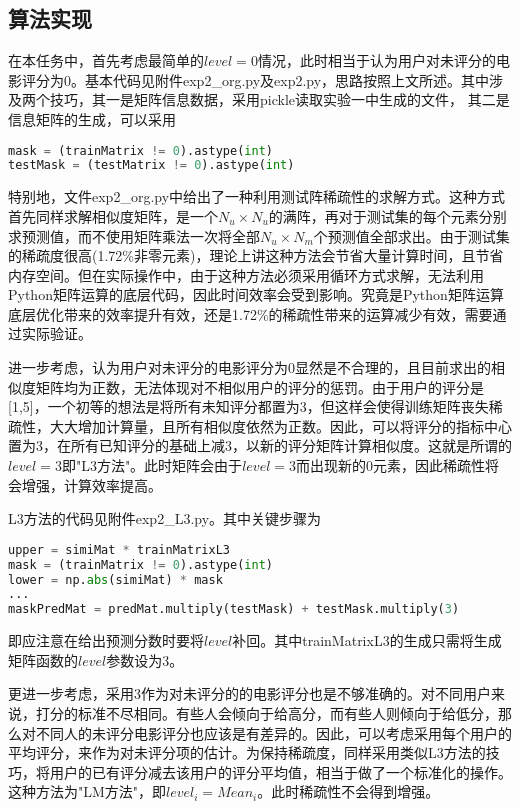\documentclass[a4paper,12pt]{article}
\begin{document}
    \subsection{算法实现}
    在本任务中，首先考虑最简单的$level=0$情况，此时相当于认为用户对未评分的电影评分为0。基本代码见附件exp2\_org.py及exp2.py，思路按照上文所述。其中涉及两个技巧，其一是矩阵信息数据，采用pickle读取实验一中生成的文件，
    其二是信息矩阵的生成，可以采用
    \begin{lstlisting}[language=python]
mask = (trainMatrix != 0).astype(int)
testMask = (testMatrix != 0).astype(int)
    \end{lstlisting}

    特别地，文件exp2\_org.py中给出了一种利用测试阵稀疏性的求解方式。这种方式首先同样求解相似度矩阵，是一个$N_u\times N_u$的满阵，再对于测试集的每个元素分别求预测值，而不使用矩阵乘法一次将全部$N_u\times N_m$个预测值全部求出。由于测试集的稀疏度很高(1.72\%非零元素)，理论上讲这种方法会节省大量计算时间，且节省内存空间。但在实际操作中，由于这种方法必须采用循环方式求解，无法利用Python矩阵运算的底层代码，因此时间效率会受到影响。究竟是Python矩阵运算底层优化带来的效率提升有效，还是1.72\%的稀疏性带来的运算减少有效，需要通过实际验证。

    进一步考虑，认为用户对未评分的电影评分为0显然是不合理的，且目前求出的相似度矩阵均为正数，无法体现对不相似用户的评分的惩罚。由于用户的评分是[1,5]，一个初等的想法是将所有未知评分都置为3，但这样会使得训练矩阵丧失稀疏性，大大增加计算量，且所有相似度依然为正数。因此，可以将评分的指标中心置为3，在所有已知评分的基础上减3，以新的评分矩阵计算相似度。这就是所谓的$level=3$即"L3方法"。此时矩阵会由于$level=3$而出现新的0元素，因此稀疏性将会增强，计算效率提高。

    L3方法的代码见附件exp2\_L3.py。其中关键步骤为
    \begin{lstlisting}[language=python]
upper = simiMat * trainMatrixL3
mask = (trainMatrix != 0).astype(int)
lower = np.abs(simiMat) * mask
...
maskPredMat = predMat.multiply(testMask) + testMask.multiply(3)
    \end{lstlisting}
    即应注意在给出预测分数时要将$level$补回。其中trainMatrixL3的生成只需将生成矩阵函数的$level$参数设为3。

    更进一步考虑，采用3作为对未评分的的电影评分也是不够准确的。对不同用户来说，打分的标准不尽相同。有些人会倾向于给高分，而有些人则倾向于给低分，那么对不同人的未评分电影评分也应该是有差异的。因此，可以考虑采用每个用户的平均评分，来作为对未评分项的估计。为保持稀疏度，同样采用类似L3方法的技巧，将用户的已有评分减去该用户的评分平均值，相当于做了一个标准化的操作。这种方法为"LM方法"，即$level_i=Mean_i$。此时稀疏性不会得到增强。
\end{document}
